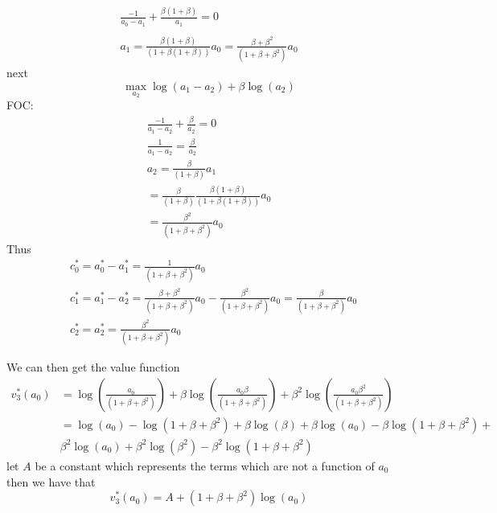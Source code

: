 \documentclass[12pt]{article}
\begin{document}
\begin{enumerate}
\begin{align*}
	\frac{-1}{a_0 - a_1} + \frac{\beta (1 + \beta)}{a_1} = 0 \\\\
	a_1 = \frac{\beta(1+\beta)}{(1 + \beta(1+\beta))} a_0 = \frac{\beta+\beta^2}{(1 + \beta+\beta^2)} a_0
\end{align*}
next 
$$\max_{a_2} \log(a_1 - a_2) + \beta \log(a_2)$$
FOC:
\begin{align*}
	\frac{-1}{a_1 - a_2} + \frac{\beta}{a_2} = 0 \\
	\frac{1}{a_1 - a_2} = \frac{\beta}{a_2}  \\
	a_2 = \frac{\beta}{(1+ \beta)}a_1 \\
	    = \frac{\beta}{(1+ \beta)} \frac{\beta(1+\beta)}{(1 + \beta(1+\beta))} a_0 \\
	    = \frac{\beta^2}{(1 + \beta +\beta^2)} a_0 
\end{align*}
Thus 
\begin{align*}
&c_0^* = a_0^* - a_1^* = \frac{1}{(1 + \beta +\beta^2)} a_0 \\
&c_1^* = a_1^* - a_2^* = \frac{\beta+\beta^2}{(1 + \beta+\beta^2)} a_0 - \frac{\beta^2}{(1 + \beta +\beta^2)} a_0 = \frac{\beta}{(1 + \beta +\beta^2)} a_0 \\
&c_2^* = a_2^* = \frac{\beta^2}{(1 + \beta +\beta^2)} a_0
\end{align*}

We can then get the value function 
\begin{align*}
	v_3^* ( a_0) &= \log(\frac{a_0}{(1 + \beta +\beta^2)} ) + \beta \log(\frac{a_0 \beta}{(1 + \beta +\beta^2)} ) + \beta^2 \log(\frac{a_0 \beta^2}{(1 + \beta +\beta^2)} ) \\
		     &= \log(a_0) - \log(1 + \beta + \beta^2) + \beta \log(\beta) + \beta\log(a_0) - \beta \log(1 + \beta + \beta^2) + \\
		     & \beta^2 \log(a_0) + \beta^2 \log(\beta^2) - \beta^2\log(1 + \beta + \beta^2)
\end{align*}
let $A$ be a constant which represents the terms which are not a function of $a_0$ then we have that
$$v_3^* ( a_0) = A + (1 + \beta + \beta^2) \log(a_0)$$


\end{enumerate}
\end{document}
